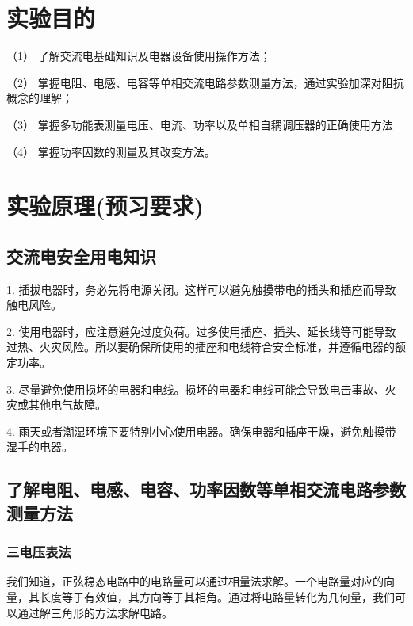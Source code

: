 \documentclass{ctexart}
\begin{document}
\section{实验目的}
（1） 了解交流电基础知识及电器设备使用操作方法；

（2） 掌握电阻、电感、电容等单相交流电路参数测量方法，通过实验加深对阻抗概念的理解；

（3） 掌握多功能表测量电压、电流、功率以及单相自耦调压器的正确使用方法

（4） 掌握功率因数的测量及其改变方法。

\section{实验原理(预习要求)}
\subsection{交流电安全用电知识}
1. 插拔电器时，务必先将电源关闭。这样可以避免触摸带电的插头和插座而导致触电风险。

2. 使用电器时，应注意避免过度负荷。过多使用插座、插头、延长线等可能导致过热、火灾风险。所以要确保所使用的插座和电线符合安全标准，并遵循电器的额定功率。

3. 尽量避免使用损坏的电器和电线。损坏的电器和电线可能会导致电击事故、火灾或其他电气故障。

4. 雨天或者潮湿环境下要特别小心使用电器。确保电器和插座干燥，避免触摸带湿手的电器。
\subsection{了解电阻、电感、电容、功率因数等单相交流电路参数测量方法}
\subsubsection{三电压表法}
我们知道，正弦稳态电路中的电路量可以通过相量法求解。一个电路量对应的向量，其长度等于有效值，其方向等于其相角。通过将电路量转化为几何量，我们可以通过解三角形的方法求解电路。
\end{document}
